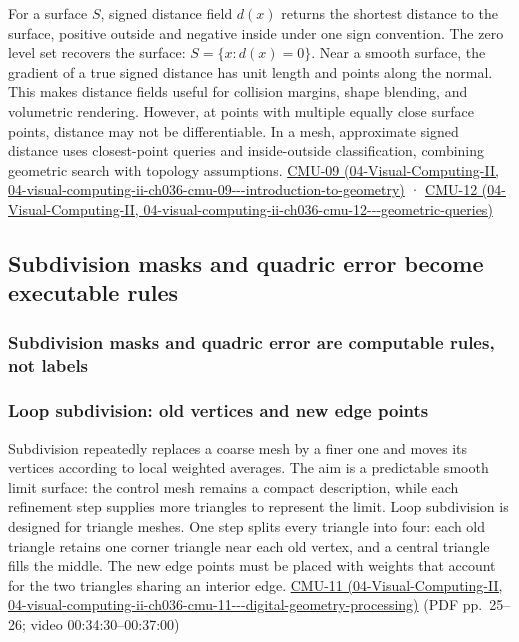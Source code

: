 For a surface \(S\), signed distance field \(d(x)\) returns the shortest distance to the surface, positive outside and negative inside under one sign convention. The zero level set recovers the surface: \(S=\{x:d(x)=0\}\). Near a smooth surface, the gradient of a true signed distance has unit length and points along the normal. This makes distance fields useful for collision margins, shape blending, and volumetric rendering. However, at points with multiple equally close surface points, distance may not be differentiable. In a mesh, approximate signed distance uses closest-point queries and inside-outside classification, combining geometric search with topology assumptions. \href{../04-Visual-Computing-II/main.pdf\#nameddest=04-visual-computing-ii-ch036-cmu-09---introduction-to-geometry}{CMU-09 (04-Visual-Computing-II, 04-visual-computing-ii-ch036-cmu-09-\/-\/-introduction-to-geometry)} · \href{../04-Visual-Computing-II/main.pdf\#nameddest=04-visual-computing-ii-ch036-cmu-12---geometric-queries}{CMU-12 (04-Visual-Computing-II, 04-visual-computing-ii-ch036-cmu-12-\/-\/-geometric-queries)}

\subsection{Subdivision masks and quadric error become executable rules}\label{03-visual-computing-i-ch002-subdivision-masks-and-quadric-error-become-executable-rules}

\subsubsection{Subdivision masks and quadric error are computable rules, not labels}\label{03-visual-computing-i-ch002-subdivision-masks-and-quadric-error-are-computable-rules-not-labels}

\subsubsection{Loop subdivision: old vertices and new edge points}\label{03-visual-computing-i-ch002-loop-subdivision-old-vertices-and-new-edge-points}

Subdivision repeatedly replaces a coarse mesh by a finer one and moves its vertices according to local weighted averages. The aim is a predictable smooth limit surface: the control mesh remains a compact description, while each refinement step supplies more triangles to represent the limit. Loop subdivision is designed for triangle meshes. One step splits every triangle into four: each old triangle retains one corner triangle near each old vertex, and a central triangle fills the middle. The new edge points must be placed with weights that account for the two triangles sharing an interior edge. \href{../04-Visual-Computing-II/main.pdf\#nameddest=04-visual-computing-ii-ch036-cmu-11---digital-geometry-processing}{CMU-11 (04-Visual-Computing-II, 04-visual-computing-ii-ch036-cmu-11-\/-\/-digital-geometry-processing)} (PDF pp.~25--26; video 00:34:30--00:37:00)

